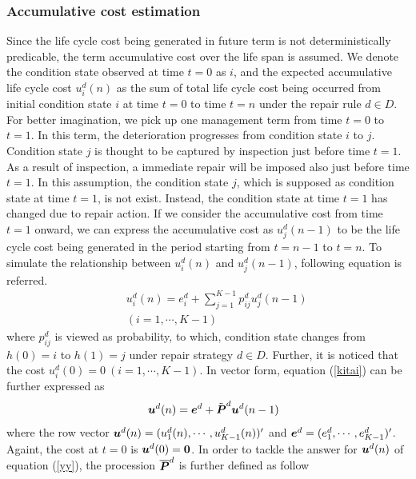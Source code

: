 \subsubsection{Accumulative cost estimation}
\label{6331}
Since the life cycle cost being generated in future term is not deterministically predicable, the term accumulative cost over the life span is assumed. We denote the condition state observed at time $t=0$ as $i$, and the expected accumulative life cycle cost $u_i^d(n)$ as the sum of total life cycle cost being occurred from initial condition state $i$ at time $t=0$ to time $t=n$ under the repair rule $d\in D$. For better imagination, we pick up one management term from time $t=0$ to $t=1$. In this term, the deterioration progresses from condition state $i$ to $j$. Condition state $j$ is thought to be captured by inspection just before time $t=1$. As a result of inspection, a immediate repair will be imposed also just before time $t=1$. In this assumption, the condition state $j$, which is supposed as condition state at time $t=1$, is not exist. Instead, the condition state at time $t=1$ has changed due to repair action. If we consider the accumulative cost from time $t=1$ onward, we can express the accumulative cost as $u_j^d(n-1)$ to be the life cycle cost being generated in the period starting from $t=n-1$ to $t=n$. To simulate the relationship between $u_i^d(n) $ and $u_j^d(n-1)$, following equation is referred.
\begin{eqnarray}
&& u^d_{i}(n) =e^d_{i}+\sum_{j=1}^{K-1}p_{ij}^d u^d_{j}(n-1) \label{kitai} \\
&& (i=1,\cdots,K-1) \nonumber
\end{eqnarray}
where $p_{ij}^d$ is viewed as probability, to which, condition state changes from $h(0)=i$ to $h(1) = j$ under repair strategy $d\in D$. Further, it is noticed that the cost $u_i^d(0) = 0~(i=1, \cdots,K-1)$. In vector form, equation (\ref{kitai}) can be further expressed as
\begin{eqnarray}
&& \mbox{\boldmath$u$}^d(n)=\mbox{\boldmath$e$}^d+ \tilde{\mbox{\boldmath$P$}}^d\mbox{\boldmath$u$}^d(n-1) \label{yy}
\end{eqnarray}
where the row vector $\mbox{\boldmath$u$}^d(n)=(u_1^d(n),\cdots,u_{K-1}^d(n))^\prime$ and $\mbox{\boldmath$e$}^d=(e_1^d,\cdots,e_{K-1}^d)^\prime$. Againt, the cost at $t=0$ is $\mbox{\boldmath$u$}^d(0)=\mbox{\boldmath$0$}$. In order to tackle the answer for $\mbox{\boldmath$u$}^d(n)$ of equation (\ref{yy}), the procession $\overline{\mbox{\boldmath$P$}}^d$ is further defined as follow
